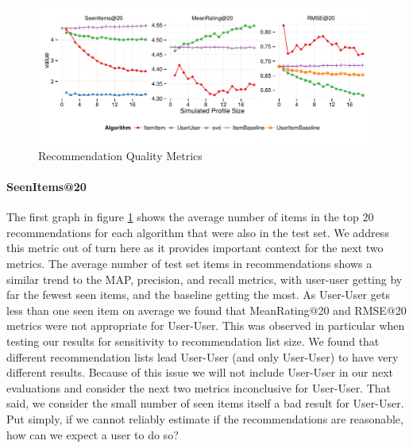 \documentclass[letterpaper]{sig-alternate}
\begin{document}

\begin{figure}[ht!]
  \centering
  \includegraphics[width=\linewidth]{../lenskit/output/ekstrandTuned20/rmse_20.pdf}
  \caption{Recommendation Quality Metrics}
  \label{fig:topN.rmse}
\end{figure}

  \paragraph{SeenItems@20}
  The first graph in figure \ref{fig:topN.rmse} shows the average number of items in the top 20 recommendations for each algorithm that were also in the test set.
  We address this metric out of turn here as it provides important context for the next two metrics.
  The average number of test set items in recommendations shows a similar trend to the MAP, precision, and recall metrics, with user-user getting by far the fewest seen items, and the baseline getting the most.
  As User-User gets less than one seen item on average we found that MeanRating@20 and RMSE@20 metrics were not appropriate for User-User.
  This was observed in particular when testing our results for sensitivity to recommendation list size.
  We found that different recommendation lists lead User-User (and only User-User) to have very different results.
  Because of this issue we will not include User-User in our next evaluations and consider the next two metrics inconclusive for User-User.
  That said, we consider the small number of seen items itself a bad result for User-User.
  Put simply, if we cannot reliably estimate if the recommendations are reasonable, how can we expect a user to do so?
\end{document}
